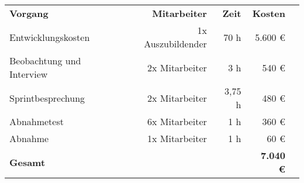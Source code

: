 \begin{tabular}{Xrrrr}
	\hline
	\hline
	\rowcolor{heading}\textbf{Vorgang} & \textbf{Mitarbeiter} & \textbf{Zeit} & \textbf{Kosten}\\
	Entwicklungskosten & 1x Auszubildender	& 70 h	& 5.600 €\\
	\rowcolor{odd}Beobachtung und Interview & 2x Mitarbeiter	& 3 h & 540 €\\
	Sprintbesprechung &	2x Mitarbeiter	& 3,75 h & 480 €\\
	\rowcolor{odd}Abnahmetest &	6x Mitarbeiter & 1 h & 360 €\\
	Abnahme & 1x Mitarbeiter & 1 h	& 60 €\\
	\hline
	\hline
	\rowcolor{odd}\textbf{Gesamt} & & & \textbf{7.040 €}\\
	\hline
\end{tabular}
